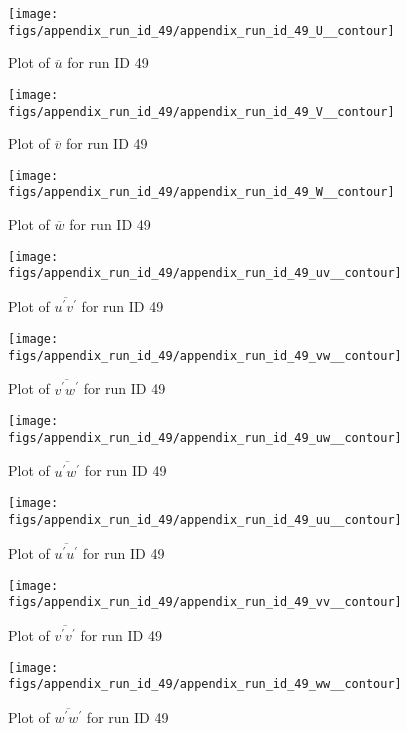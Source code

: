 \begin{figure}[H]
\centering
\texttt{[image: figs/appendix\_run\_id\_49/appendix\_run\_id\_49\_U\_\_contour]}
\caption{Plot of $\overline{u}$ for run ID 49}
\label{fig:appendix_run_id_49_U__contour}
\end{figure}


\begin{figure}[H]
\centering
\texttt{[image: figs/appendix\_run\_id\_49/appendix\_run\_id\_49\_V\_\_contour]}
\caption{Plot of $\overline{v}$ for run ID 49}
\label{fig:appendix_run_id_49_V__contour}
\end{figure}


\begin{figure}[H]
\centering
\texttt{[image: figs/appendix\_run\_id\_49/appendix\_run\_id\_49\_W\_\_contour]}
\caption{Plot of $\overline{w}$ for run ID 49}
\label{fig:appendix_run_id_49_W__contour}
\end{figure}


\begin{figure}[H]
\centering
\texttt{[image: figs/appendix\_run\_id\_49/appendix\_run\_id\_49\_uv\_\_contour]}
\caption{Plot of $\overline{u^\prime v^\prime}$ for run ID 49}
\label{fig:appendix_run_id_49_uv__contour}
\end{figure}


\begin{figure}[H]
\centering
\texttt{[image: figs/appendix\_run\_id\_49/appendix\_run\_id\_49\_vw\_\_contour]}
\caption{Plot of $\overline{v^\prime w^\prime}$ for run ID 49}
\label{fig:appendix_run_id_49_vw__contour}
\end{figure}


\begin{figure}[H]
\centering
\texttt{[image: figs/appendix\_run\_id\_49/appendix\_run\_id\_49\_uw\_\_contour]}
\caption{Plot of $\overline{u^\prime w^\prime}$ for run ID 49}
\label{fig:appendix_run_id_49_uw__contour}
\end{figure}


\begin{figure}[H]
\centering
\texttt{[image: figs/appendix\_run\_id\_49/appendix\_run\_id\_49\_uu\_\_contour]}
\caption{Plot of $\overline{u^\prime u^\prime}$ for run ID 49}
\label{fig:appendix_run_id_49_uu__contour}
\end{figure}


\begin{figure}[H]
\centering
\texttt{[image: figs/appendix\_run\_id\_49/appendix\_run\_id\_49\_vv\_\_contour]}
\caption{Plot of $\overline{v^\prime v^\prime}$ for run ID 49}
\label{fig:appendix_run_id_49_vv__contour}
\end{figure}


\begin{figure}[H]
\centering
\texttt{[image: figs/appendix\_run\_id\_49/appendix\_run\_id\_49\_ww\_\_contour]}
\caption{Plot of $\overline{w^\prime w^\prime}$ for run ID 49}
\label{fig:appendix_run_id_49_ww__contour}
\end{figure}


